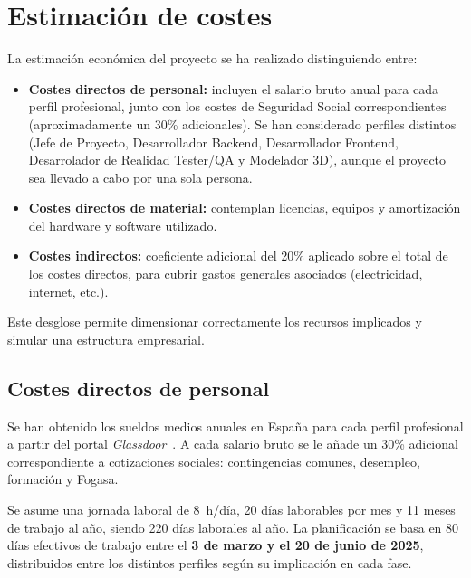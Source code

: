 \section{Estimación de costes}

La estimación económica del proyecto se ha realizado distinguiendo entre:
\begin{itemize}
  \item \textbf{Costes directos de personal:} incluyen el salario bruto anual para cada perfil profesional, junto con los costes de Seguridad Social correspondientes (aproximadamente un 30\% adicionales). Se han considerado perfiles distintos (Jefe de Proyecto, Desarrollador Backend, Desarrollador Frontend, Desarrolador de Realidad Tester/QA y Modelador 3D), aunque el proyecto sea llevado a cabo por una sola persona.
  \item \textbf{Costes directos de material:} contemplan licencias, equipos y amortización del hardware y software utilizado.
  \item \textbf{Costes indirectos:} coeficiente adicional del 20\% aplicado sobre el total de los costes directos, para cubrir gastos generales asociados (electricidad, internet, etc.).
\end{itemize}


Este desglose permite dimensionar correctamente los recursos implicados y simular una estructura empresarial.

\subsection{Costes directos de personal}

Se han obtenido los sueldos medios anuales en España para cada perfil profesional a partir del portal \textit{Glassdoor}~\cite{glassdoorJefeProyecto,glassdoorFrontend,glassdoorBackend,glassdoorTester,glassdoorModelador3D,glassdoorDiseñadr,glassdoorARDeveloper}. A cada salario bruto se le añade un 30\% adicional correspondiente a cotizaciones sociales: contingencias comunes, desempleo, formación y Fogasa.

Se asume una jornada laboral de 8~h/día, 20 días laborables por mes y 11 meses de trabajo al año, siendo 220 días laborales al año. La planificación se basa en 80 días efectivos de trabajo entre el \textbf{3 de marzo y el 20 de junio de 2025}, distribuidos entre los distintos perfiles según su implicación en cada fase.

